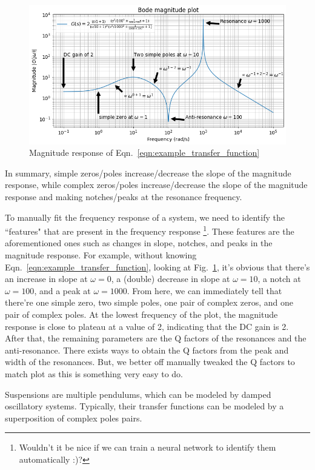 \begin{figure}[!ht]
	\centering
	\includegraphics[width=1\linewidth]{figures/example_transfer_function_plot}
	\caption{Magnitude response of Eqn.~\eqref{eqn:example_transfer_function}}
	\label{fig:exampletransferfunctionplot}
\end{figure}

In summary, simple zeros/poles increase/decrease the slope of the magnitude response, while complex zeros/poles increase/decrease the slope of the magnitude response and making notches/peaks at the resonance frequency.

To manually fit the frequency response of a system, we need to identify the ``features" that are present in the frequency response \footnote{Wouldn't it be nice if we can train a neural network to identify them automatically :)?}.
These features are the aforementioned ones such as changes in slope, notches, and peaks in the magnitude response.
For example, without knowing Eqn.~\eqref{eqn:example_transfer_function}, looking at Fig.~\ref{fig:exampletransferfunctionplot}, it's obvious that there's an increase in slope at $\omega=0$, a (double) decrease in slope at $\omega=10$, a notch at $\omega=100$, and a peak at $\omega=1000$.
From here, we can immediately tell that there're one simple zero, two simple poles, one pair of complex zeros, and one pair of complex poles.
At the lowest frequency of the plot, the magnitude response is close to plateau at a value of 2, indicating that the DC gain is 2.
After that, the remaining parameters are the Q factors of the resonances and the anti-resonance.
There exists ways to obtain the Q factors from the peak and width of the resonances.
But, we better off manually tweaked the Q factors to match plot as this is something very easy to do.



Suspensions are multiple pendulums, which can be modeled by damped oscillatory systems.
Typically, their transfer functions can be modeled by a superposition of complex poles pairs. 
